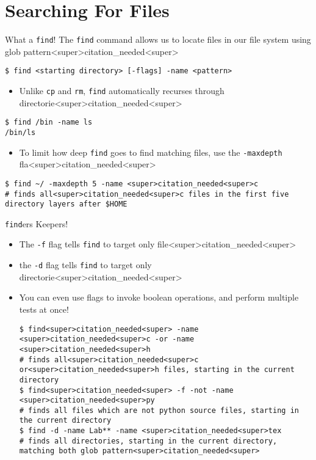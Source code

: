 \documentclass[11pt]{beamer}
\begin{document}
\section[Find]{Searching For Files}
\begin{frame}[fragile=singleslide]{What a \texttt{find}!}
The \texttt{find} command allows us to locate files in our file system using glob pattern<super>citation_needed<super> 
\begin{lstlisting}[style=terminal]
$ find <starting directory> [-flags] -name <pattern>
\end{lstlisting}
\begin{itemize}
\item Unlike \texttt{cp} and \texttt{rm}, \texttt{find} automatically recurses through directorie<super>citation_needed<super>  
\end{itemize}
\begin{lstlisting}[style=terminal]
$ find /bin -name ls
/bin/ls
\end{lstlisting}
\begin{itemize}
\item To limit how deep \texttt{find} goes to find matching files, use the \texttt{-maxdepth} fla<super>citation_needed<super>
\end{itemize}
\begin{lstlisting}[style=terminal]
$ find ~/ -maxdepth 5 -name <super>citation_needed<super>c
# finds all<super>citation_needed<super>c files in the first five directory layers after $HOME
\end{lstlisting}
\end{frame}

\begin{frame}[fragile=singleslide]{\texttt{find}ers Keepers!}
\begin{itemize}
\item The \texttt{-f} flag tells \texttt{find} to target only file<super>citation_needed<super>
\item the \texttt{-d} flag tells \texttt{find} to target only directorie<super>citation_needed<super>  
\item You can even use flags to invoke boolean operations, and perform multiple tests at once! 
\begin{lstlisting}[style=terminal]
$ find<super>citation_needed<super> -name <super>citation_needed<super>c -or -name <super>citation_needed<super>h
# finds all<super>citation_needed<super>c or<super>citation_needed<super>h files, starting in the current directory
$ find<super>citation_needed<super> -f -not -name <super>citation_needed<super>py 
# finds all files which are not python source files, starting in the current directory
$ find -d -name Lab** -name <super>citation_needed<super>tex
# finds all directories, starting in the current directory, matching both glob pattern<super>citation_needed<super>  
\end{lstlisting}
\end{itemize}
\end{frame}
\end{document}
